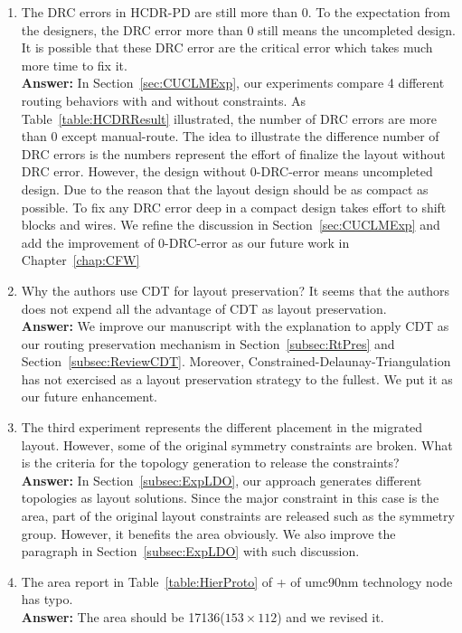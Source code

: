 \begin{enumerate}
  \item The DRC errors in HCDR-PD are still more than 0. To the expectation from the designers, the DRC error more than 0 still means the uncompleted design. It is possible that these DRC error are the critical error which takes much more time to fix it. \\
  {\bf Answer:} In Section~\ref{sec:CUCLMExp}, our experiments compare 4 different routing behaviors with and without constraints. As Table~\ref{table:HCDRResult} illustrated, the number of DRC errors are more than 0 except manual-route. The idea to illustrate the difference number of DRC errors is the numbers represent the effort of finalize the layout without DRC error. However, the design without 0-DRC-error means uncompleted design. Due to the reason that the layout design should be as compact as possible. To fix any DRC error deep in a compact design takes effort to shift blocks and wires. We refine the discussion in Section~\ref{sec:CUCLMExp} and add the improvement of 0-DRC-error as our future work in Chapter~\ref{chap:CFW}
  \item Why the authors use CDT for layout preservation? It seems that the authors does not expend all the advantage of CDT as layout preservation. \\
  {\bf Answer:} We improve our manuscript with the explanation to apply CDT as our routing preservation mechanism in Section~\ref{subsec:RtPres} and Section~\ref{subsec:ReviewCDT}. Moreover, Constrained-Delaunay-Triangulation has not exercised as a layout preservation strategy to the fullest. We put it as our future enhancement. 
  \item The third experiment represents the different placement in the migrated layout. However, some of the original symmetry constraints are broken. What is the criteria for the topology generation to release the constraints? \\
  {\bf Answer:} In Section~\ref{subsec:ExpLDO}, our approach generates different topologies as layout solutions. Since the major constraint in this case is the area, part of the original layout constraints are released such as the symmetry group. However, it benefits the area obviously. We also improve the paragraph in Section~\ref{subsec:ExpLDO} with such discussion. 
  \item The area report in Table~\ref{table:HierProto}  of \cite{msc-bhattacharya-tcad06}+\cite{Chin_DMR_ICCAD2013} of umc90nm technology node has typo. \\
  {\bf Answer:} The area should be 17136($153\times 112$) and we revised it.

\end{enumerate}
